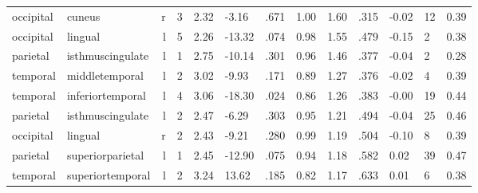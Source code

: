 \documentclass{article}
\begin{document}
\begin{longtable}{llrR{1.3cm}R{1cm}R{1.3cm}R{1cm}R{1cm}R{1.3cm}R{1cm}R{1.8cm}R{1.3cm}R{1.8cm}}
 occipital &                    cuneus &    r &         3 &                  2.32 &            -3.16 &               .671 &                               1.00 &                          1.60 &                            .315 &  -0.02 &     12 &      0.39 \\
 occipital &                   lingual &    l &         5 &                  2.26 &           -13.32 &               .074 &                               0.98 &                          1.55 &                            .479 &  -0.15 &      2 &      0.38 \\
  parietal &          isthmuscingulate &    l &         1 &                  2.75 &           -10.14 &               .301 &                               0.96 &                          1.46 &                            .377 &  -0.04 &      2 &      0.28 \\
  temporal &            middletemporal &    l &         2 &                  3.02 &            -9.93 &               .171 &                               0.89 &                          1.27 &                            .376 &  -0.02 &      4 &      0.39 \\
  temporal &          inferiortemporal &    l &         4 &                  3.06 &           -18.30 &               .024 &                               0.86 &                          1.26 &                            .383 &  -0.00 &     19 &      0.44 \\
  parietal &          isthmuscingulate &    l &         2 &                  2.47 &            -6.29 &               .303 &                               0.95 &                          1.21 &                            .494 &  -0.04 &     25 &      0.46 \\
 occipital &                   lingual &    r &         2 &                  2.43 &            -9.21 &               .280 &                               0.99 &                          1.19 &                            .504 &  -0.10 &      8 &      0.39 \\
  parietal &          superiorparietal &    l &         1 &                  2.45 &           -12.90 &               .075 &                               0.94 &                          1.18 &                            .582 &   0.02 &     39 &      0.47 \\
  temporal &          superiortemporal &    l &         2 &                  3.24 &            13.62 &               .185 &                               0.82 &                          1.17 &                            .633 &   0.01 &      6 &      0.38 \\

\end{longtable}
\end{document}
